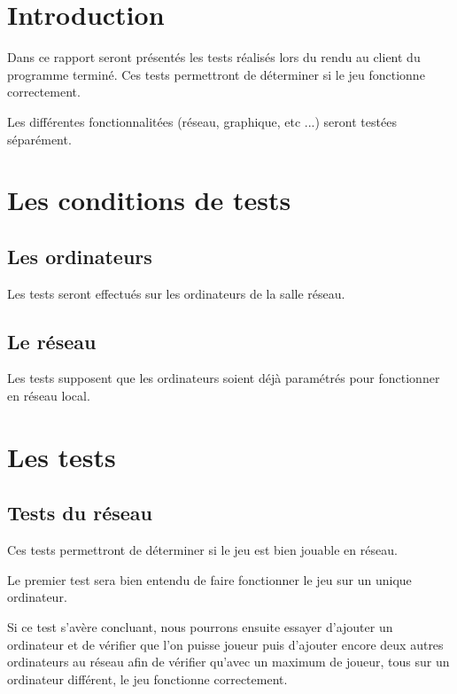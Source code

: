 \section*{Introduction}

Dans ce rapport seront présentés les tests réalisés lors du rendu au client du programme terminé. Ces tests permettront de déterminer si le jeu fonctionne correctement.

Les différentes fonctionnalitées (réseau, graphique, etc ...) seront testées séparément.

\newpage

\section{Les conditions de tests}


\subsection{Les ordinateurs}

Les tests seront effectués sur les ordinateurs de la salle réseau. 

\subsection{Le réseau}

Les tests supposent que les ordinateurs soient déjà paramétrés pour fonctionner en réseau local.

\newpage

\section{Les tests}

\subsection{Tests du réseau}

Ces tests permettront de déterminer si le jeu est bien jouable en réseau.

Le premier test sera bien entendu de faire fonctionner le jeu sur un unique ordinateur.

Si ce test s'avère concluant, nous pourrons ensuite essayer d'ajouter un ordinateur et de vérifier que l'on puisse joueur puis d'ajouter encore deux autres ordinateurs au réseau afin de vérifier qu'avec un maximum de joueur, tous sur un ordinateur différent, le jeu fonctionne correctement.

